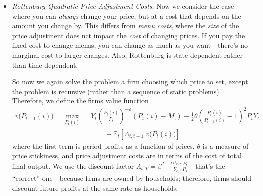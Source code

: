 \documentclass[12pt]{article}
\theoremstyle{plain}
\theoremstyle{definition}
\theoremstyle{remark}
\newcommand{\E}{\mathbb{E}}
\begin{document}
\begin{enumerate}[label=(\roman*)]
\begin{itemize}
      \item \emph{Rottenburg Quadratic Price Adjustment Costs}: Now we
        consider the case where you can \emph{always} change your price,
        but at a cost that depends on the amount you change by.  This
        differs from \emph{menu costs}, where the \emph{size} of the
        price adjustment does not impact the \emph{cost} of changing
        prices. If you pay the fixed cost to change menus, you can
        change as much as you want---there's no marginal cost to larger
        changes.  Also, Rottenburg is state-dependent rather than
        time-dependent.

        So now we again solve the problem a firm choosing which price to
        set, except the problem is recursive (rather than a sequence of
        static problems). Therefore, we define the firms value function
        \begin{align*}
          v\big(P_{t-1}(i)\big) =
          \max_{P_t(i)}\;\;
          &
          Y_t\left(
          \frac{P_t(i)}{P_t}
          \right)^{-\varepsilon}
          \left(
          P_t(i)-M_t
          \right)
          - \frac{1}{2}\theta
          \left(
          \frac{P_{t}(i)}{P_{t-1}(i)}-1
          \right)^2
          P_tY_t \\
          &\qquad
          + \E_t\left[\Lambda_{t,t+1}\;v\big(P_t(i)\big)\right]
        \end{align*}
        where the first term is period profits as a function of prices,
        $\theta$ is a measure of price stickiness, and price adjustment
        costs are in terms of the cost of total final output.  We use
        the discount factor
        $\Lambda_{t,T}=\beta^{T-t}
        \frac{U_{c,T}}{U_{c,t}}\frac{P_t}{P_T}$---that's the ``correct''
        one---because firms are owned by households; therefore, firms
        should discount future profits at the same rate as households.


\end{itemize}
\end{enumerate}
\end{document}
